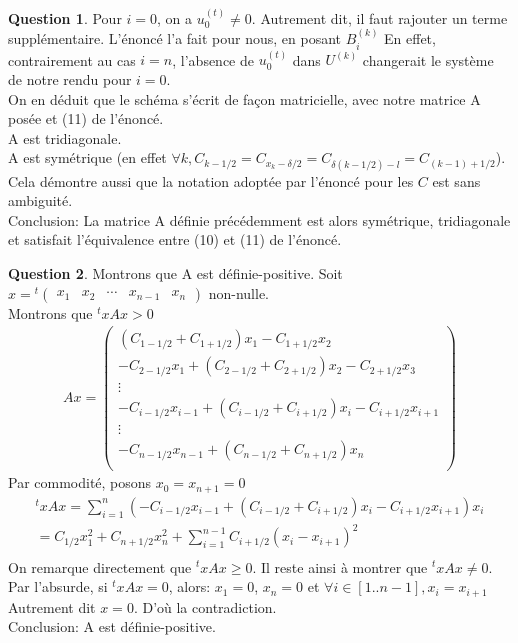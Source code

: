 \documentclass[a4paper]{article}
\theoremstyle{definition}
\newtheorem{que}{Question}
\begin{document}
\begin{que}
		Pour $i = 0$, on a $u_0^{(t)} \ne 0$. Autrement dit, il faut rajouter un terme supplémentaire.
		L'énoncé l'a fait pour nous, en posant $B_i^{(k)}$
		En effet, contrairement au cas $i=n$, l'absence de $u_0^{(t)}$ dans $U^{(k)}$ changerait le système de notre rendu pour $i=0$. \\

		On en déduit que le schéma s'écrit de façon matricielle, avec notre matrice A posée et (11) de l'énoncé. \\

		A est tridiagonale. \\

		A est symétrique (en effet $\forall k, C_{k-1/2} = C_{x_k - \delta / 2} = C_{\delta (k - 1/2) - l} = C_{(k-1)+1/2}$). \\
		Cela démontre aussi que la notation adoptée par l'énoncé pour les $C$ est sans ambiguité. \\

		Conclusion: La matrice A définie précédemment est alors symétrique, tridiagonale et satisfait l'équivalence entre (10) et (11) de l'énoncé. \\
	\end{que}
	\begin{que}
		Montrons que A est définie-positive.
		Soit $ x = {}^t \begin{pmatrix} x_1 & x_2 & \cdots & x_{n-1} & x_n \end{pmatrix}$ non-nulle. \\
		Montrons que ${}^txAx > 0$
		\begin{align*}
			Ax=
			\begin{pmatrix}
				(C_{1-1/2} + C_{1+1/2}) x_1 - C_{1+1/2} x_2 \\
				 - C_{2-1/2} x_1 + (C_{2-1/2} + C_{2+1/2}) x_2 - C_{2+1/2} x_3 \\
				\vdots \\
				- C_{i-1/2} x_{i-1} + (C_{i-1/2} + C_{i+1/2}) x_i - C_{i+1/2} x_{i+1} \\
				\vdots \\
				- C_{n-1/2} x_{n-1} + (C_{n-1/2} + C_{n+1/2}) x_n \\
			\end{pmatrix}
		\end{align*}
		Par commodité, posons $ x_0 = x_{n+1} = 0$
		\begin{align*}
			{}^txAx=\sum_{i=1}^n (- C_{i-1/2} x_{i-1} + (C_{i-1/2} + C_{i+1/2}) x_i - C_{i+1/2} x_{i+1}) x_i \\
			= C_{1/2} x_1^2 + C_{n+1/2} x_n^2 + \sum_{i=1}^{n-1} C_{i+1/2} (x_i - x_{i+1})^2 \\
		\end{align*}
		On remarque directement que ${}^txAx \ge 0$.
		Il reste ainsi à montrer que ${}^txAx \ne 0$. \\
		Par l'absurde, si ${}^txAx=0$, alors:
		$x_1 = 0$, $x_n = 0$ et $\forall i \in [1..n-1], x_i = x_{i+1}$ \\
		Autrement dit $x = 0$. D'où la contradiction. \\
		Conclusion: A est définie-positive.
	\end{que}
\end{document}

